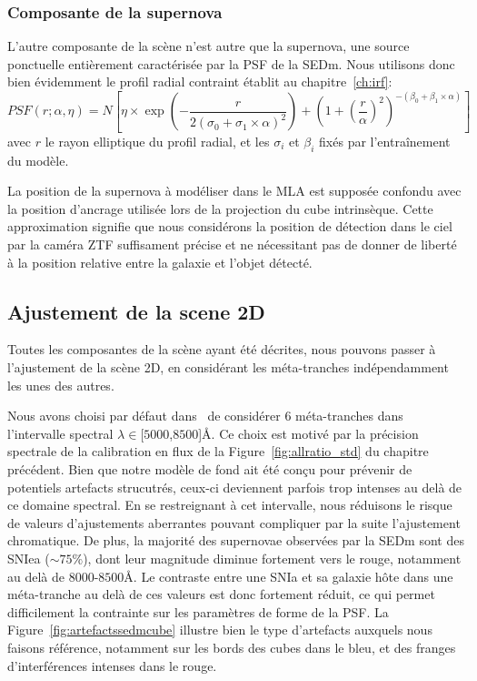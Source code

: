 \documentclass[../main/main.tex]{subfiles}
\begin{document}
\subsubsection{Composante de la supernova}

L'autre composante de la scène n'est autre que la supernova, une source
ponctuelle entièrement caractérisée par la PSF de la SEDm. Nous
utilisons donc bien évidemment le profil radial contraint établit au
chapitre~\ref{ch:irf}:
\begin{equation}
  \label{eq:psfmodelconstraint}
  PSF(r; \alpha, \eta) = N\left[\eta\times\exp\left(- \frac{r}{2(\sigma_{0}+\sigma_{1}\times\alpha)^{2}}\right) +
    \left( 1+\left( \frac{r}{\alpha}\right)^{2}\right)^{-(\beta_{0}+\beta_{1}\times\alpha)} \right]
\end{equation}
avec $r$ le rayon elliptique du profil radial, et les $\sigma_{i}$ et
$\beta_{i}$ fixés par l'entraînement du modèle.

La position de la
supernova à modéliser dans le MLA est supposée confondu avec la position
d'ancrage utilisée lors de la projection du cube intrinsèque. Cette
approximation signifie que nous considérons la position de détection
dans le ciel par la caméra ZTF suffisament précise et ne nécessitant pas de
donner de liberté à la position relative entre la galaxie et l'objet
détecté.

\subsection{Ajustement de la scene 2D}

Toutes les composantes de la scène ayant été décrites, nous pouvons
passer à l'ajustement de la scène 2D, en considérant les méta-tranches
indépendamment les unes des autres.

Nous avons choisi par défaut dans \hypergal\ de considérer 6
méta-tranches dans l'intervalle
spectral $\lambda\in$[$5000$,$8500$]\AA. Ce choix est motivé par la
précision spectrale de la calibration en flux de la
Figure~\ref{fig:allratio_std} du chapitre précédent. Bien que notre
modèle de fond ait été conçu pour prévenir de potentiels artefacts
strucutrés, ceux-ci deviennent parfois trop intenses au delà de ce domaine
spectral. En se restreignant à cet intervalle, nous réduisons le risque
de valeurs d'ajustements aberrantes pouvant compliquer par la suite l'ajustement
chromatique. De plus, la majorité des supernovae observées par la
SEDm sont des SNIea ($\sim75\%$), dont leur magnitude diminue fortement
vers le rouge, notamment au delà
de $8000$-$8500$\AA. Le contraste entre une SNIa et sa galaxie hôte dans une
méta-tranche au delà de ces valeurs est donc fortement réduit, ce qui
permet difficilement la contrainte sur les paramètres de forme de la
PSF. La Figure~\ref{fig:artefactssedmcube} illustre bien le type
d'artefacts auxquels nous faisons référence, notamment sur les bords des
cubes dans le bleu, et des franges d'interférences intenses dans le rouge.
\end{document}
